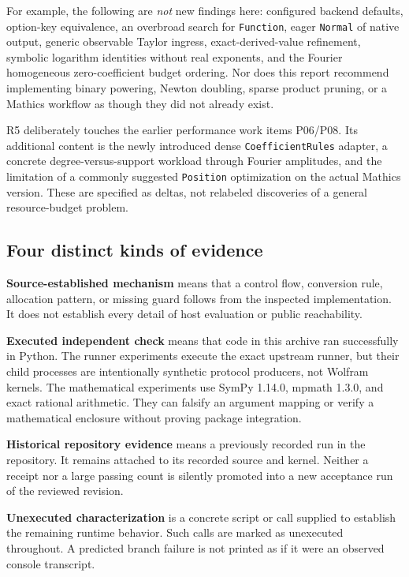 \documentclass[11pt,a4paper]{article}
\newcommand{\code}[1]{\texttt{#1}}
\begin{document}
For example, the following are \emph{not} new findings here: configured backend defaults, option-key equivalence, an overbroad search for \code{Function}, eager \code{Normal} of native output, generic observable Taylor ingress, exact-derived-value refinement, symbolic logarithm identities without real exponents, and the Fourier homogeneous zero-coefficient budget ordering. Nor does this report recommend implementing binary powering, Newton doubling, sparse product pruning, or a Mathics workflow as though they did not already exist.\cite{register,intake,workflow}

R5 deliberately touches the earlier performance work items P06/P08. Its additional content is the newly introduced dense \code{CoefficientRules} adapter, a concrete degree-versus-support workload through Fourier amplitudes, and the limitation of a commonly suggested \code{Position} optimization on the actual Mathics version. These are specified as deltas, not relabeled discoveries of a general resource-budget problem.

\subsection{Four distinct kinds of evidence}
\textbf{Source-established mechanism} means that a control flow, conversion rule, allocation pattern, or missing guard follows from the inspected implementation. It does not establish every detail of host evaluation or public reachability.

\textbf{Executed independent check} means that code in this archive ran successfully in Python. The runner experiments execute the exact upstream runner, but their child processes are intentionally synthetic protocol producers, not Wolfram kernels. The mathematical experiments use SymPy 1.14.0, mpmath 1.3.0, and exact rational arithmetic. They can falsify an argument mapping or verify a mathematical enclosure without proving package integration.

\textbf{Historical repository evidence} means a previously recorded run in the repository. It remains attached to its recorded source and kernel. Neither a receipt nor a large passing count is silently promoted into a new acceptance run of the reviewed revision.

\textbf{Unexecuted characterization} is a concrete script or call supplied to establish the remaining runtime behavior. Such calls are marked as unexecuted throughout. A predicted branch failure is not printed as if it were an observed console transcript.
\end{document}
